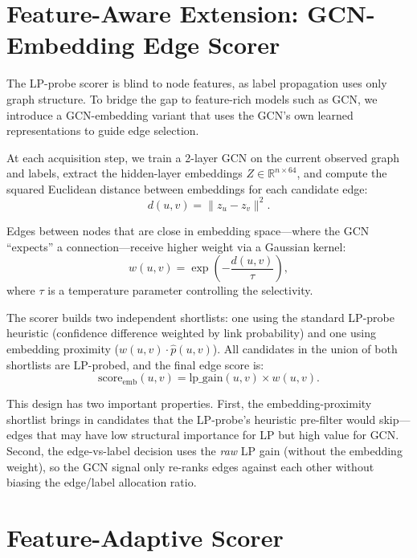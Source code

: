 \documentclass[12pt,a4paper,oneside]{report}
\begin{document}
\section{Feature-Aware Extension: GCN-Embedding Edge Scorer}
\label{sec:feat_aware}

The LP-probe scorer is blind to node features, as label propagation uses only graph structure. To bridge the gap to feature-rich models such as GCN, we introduce a GCN-embedding variant that uses the GCN's own learned representations to guide edge selection.

At each acquisition step, we train a 2-layer GCN on the current observed graph and labels, extract the hidden-layer embeddings $Z \in \mathbb{R}^{n \times 64}$, and compute the squared Euclidean distance between embeddings for each candidate edge:
\begin{equation}
    d(u,v) = \|z_u - z_v\|^2.
\end{equation}

Edges between nodes that are close in embedding space---where the GCN ``expects'' a connection---receive higher weight via a Gaussian kernel:
\begin{equation}
    w(u,v) = \exp\!\left(-\frac{d(u,v)}{\tau}\right),
\end{equation}
where $\tau$ is a temperature parameter controlling the selectivity.

The scorer builds two independent shortlists: one using the standard LP-probe heuristic (confidence difference weighted by link probability) and one using embedding proximity ($w(u,v) \cdot \hat{p}(u,v)$). All candidates in the union of both shortlists are LP-probed, and the final edge score is:
\begin{equation}
    \text{score}_{\text{emb}}(u,v) = \text{lp\_gain}(u,v) \times w(u,v).
\end{equation}

This design has two important properties. First, the embedding-proximity shortlist brings in candidates that the LP-probe's heuristic pre-filter would skip---edges that may have low structural importance for LP but high value for GCN. Second, the edge-vs-label decision uses the \emph{raw} LP gain (without the embedding weight), so the GCN signal only re-ranks edges against each other without biasing the edge/label allocation ratio.

\section{Feature-Adaptive Scorer}
\label{sec:adaptive}
\end{document}
